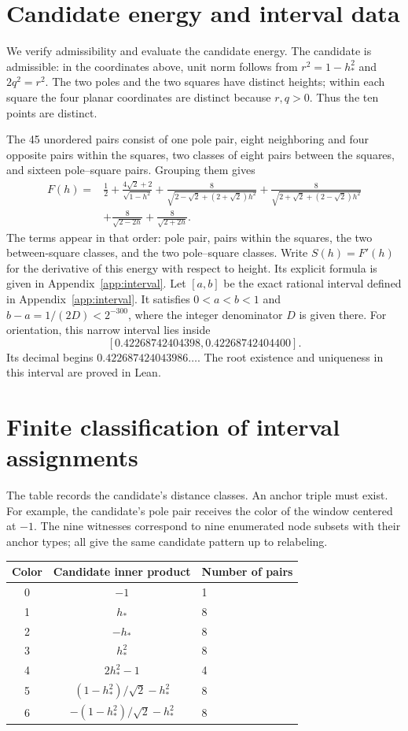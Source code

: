 \documentclass[11pt]{article}
\begin{document}
\clearpage
\begin{appendices}
\section{Candidate energy and interval data}\label{app:energydata}
We verify admissibility and evaluate the candidate energy.
The candidate is admissible: in the coordinates above, unit norm follows
from $r^2=1-h_*^2$ and $2q^2=r^2$. The two poles and the two squares
have distinct heights; within each square the four planar coordinates
are distinct because $r,q>0$. Thus the ten points are distinct.

The 45 unordered pairs consist of one pole pair, eight neighboring and
four opposite pairs within the squares, two classes of eight pairs
between the squares, and sixteen pole--square pairs. Grouping them gives
\begin{align}
 F(h)={}&\frac12+\frac{4\sqrt2+2}{\sqrt{1-h^2}}
 +\frac8{\sqrt{2-\sqrt2+(2+\sqrt2)h^2}}
 +\frac8{\sqrt{2+\sqrt2+(2-\sqrt2)h^2}}\nonumber\\
 &+\frac8{\sqrt{2-2h}}+\frac8{\sqrt{2+2h}}.\label{eq:energy}
\end{align}
The terms appear in that order: pole pair, pairs within the squares,
the two between-square classes, and the two pole--square classes.
Write $S(h)=F'(h)$ for the derivative of this energy with respect to
height. Its explicit formula is given in Appendix~\ref{app:interval}.
Let $[a,b]$ be the exact rational interval defined in
Appendix~\ref{app:interval}. It satisfies $0<a<b<1$ and
$b-a=1/(2D)<2^{-300}$, where the integer denominator $D$ is given there.
For orientation, this narrow interval lies inside
\[ [0.42268742404398,0.42268742404400]. \]
Its decimal begins $0.422687424043986\ldots$. The root existence and
uniqueness in this interval are proved in Lean.



\section{Finite classification of interval assignments}\label{app:classification}
The table records the candidate's distance classes.
An anchor triple must exist.
For example, the candidate's pole
pair receives the color of the window centered at $-1$.
The nine
witnesses correspond to nine enumerated node subsets with their anchor
types; all give the same candidate pattern up to relabeling.
\begin{center}
\begin{tabular}{ccl}
Color & Candidate inner product & Number of pairs\\ \hline
0 & $-1$ & 1\\
1 & $h_*$ & 8\\
2 & $-h_*$ & 8\\
3 & $h_*^2$ & 8\\
4 & $2h_*^2-1$ & 4\\
5 & $(1-h_*^2)/\sqrt2-h_*^2$ & 8\\
6 & $-(1-h_*^2)/\sqrt2-h_*^2$ & 8
\end{tabular}
\end{center}





\end{appendices}
\end{document}
